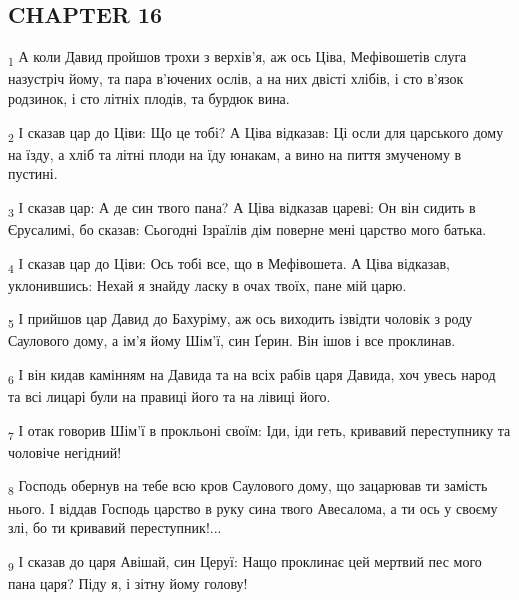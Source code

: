 \subsection{CHAPTER 16}
\begin{tcolorbox}
\textsubscript{1} А коли Давид пройшов трохи з верхів'я, аж ось Ціва, Мефівошетів слуга назустріч йому, та пара в'ючених ослів, а на них двісті хлібів, і сто в'язок родзинок, і сто літніх плодів, та бурдюк вина.
\end{tcolorbox}
\begin{tcolorbox}
\textsubscript{2} І сказав цар до Ціви: Що це тобі? А Ціва відказав: Ці осли для царського дому на їзду, а хліб та літні плоди на їду юнакам, а вино на пиття змученому в пустині.
\end{tcolorbox}
\begin{tcolorbox}
\textsubscript{3} І сказав цар: А де син твого пана? А Ціва відказав цареві: Он він сидить в Єрусалимі, бо сказав: Сьогодні Ізраїлів дім поверне мені царство мого батька.
\end{tcolorbox}
\begin{tcolorbox}
\textsubscript{4} І сказав цар до Ціви: Ось тобі все, що в Мефівошета. А Ціва відказав, уклонившись: Нехай я знайду ласку в очах твоїх, пане мій царю.
\end{tcolorbox}
\begin{tcolorbox}
\textsubscript{5} І прийшов цар Давид до Бахуріму, аж ось виходить ізвідти чоловік з роду Саулового дому, а ім'я йому Шім'ї, син Ґерин. Він ішов і все проклинав.
\end{tcolorbox}
\begin{tcolorbox}
\textsubscript{6} І він кидав камінням на Давида та на всіх рабів царя Давида, хоч увесь народ та всі лицарі були на правиці його та на лівиці його.
\end{tcolorbox}
\begin{tcolorbox}
\textsubscript{7} І отак говорив Шім'ї в прокльоні своїм: Іди, іди геть, кривавий переступнику та чоловіче негідний!
\end{tcolorbox}
\begin{tcolorbox}
\textsubscript{8} Господь обернув на тебе всю кров Саулового дому, що зацарював ти замість нього. І віддав Господь царство в руку сина твого Авесалома, а ти ось у своєму злі, бо ти кривавий переступник!...
\end{tcolorbox}
\begin{tcolorbox}
\textsubscript{9} І сказав до царя Авішай, син Церуї: Нащо проклинає цей мертвий пес мого пана царя? Піду я, і зітну йому голову!
\end{tcolorbox}
